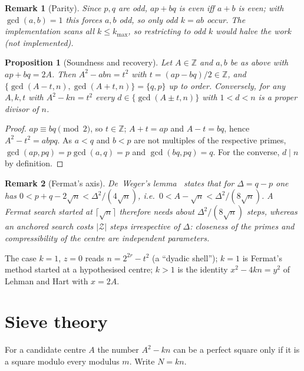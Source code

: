 \documentclass[11pt,a4paper]{article}
\newtheorem{proposition}{Proposition}[section]
\newtheorem{remark}{Remark}[section]
\newcommand{\Z}{\mathbb Z}
\begin{document}
\begin{remark}[Parity]\label{rem:parity}
Since $p,q$ are odd, $ap+bq$ is even iff $a+b$ is even; with $\gcd(a,b)=1$ this forces $a,b$ odd, so \emph{only odd $k=ab$ occur}. The implementation scans all $k\le k_{\max}$, so restricting to odd $k$ would halve the work (not implemented).
\end{remark}

\begin{proposition}[Soundness and recovery]\label{prop:rec}
Let $A\in\Z$ and $a,b$ be as above with $ap+bq=2A$. Then $A^2-abn=t^2$ with $t=(ap-bq)/2\in\Z$, and $\{\gcd(A-t,n),\gcd(A+t,n)\}=\{q,p\}$ up to order. Conversely, for any $A,k,t$ with $A^2-kn=t^2$ every $d\in\{\gcd(A\pm t,n)\}$ with $1<d<n$ is a proper divisor of $n$.
\end{proposition}
\begin{proof}
$ap\equiv bq \pmod 2$, so $t\in\Z$; $A+t=ap$ and $A-t=bq$, hence $A^2-t^2=abpq$. As $a<q$ and $b<p$ are not multiples of the respective primes, $\gcd(ap,pq)=p\gcd(a,q)=p$ and $\gcd(bq,pq)=q$. For the converse, $d\mid n$ by definition.
\end{proof}
\begin{remark}[Fermat's axis]\label{rem:fermat}
De~Weger's lemma~\cite{deweger} states that for $\Delta=q-p$ one has $0<p+q-2\sqrt n<\Delta^2/(4\sqrt n)$, i.e.\ $0<A-\sqrt n<\Delta^2/(8\sqrt n)$. A Fermat search started at $\lceil\sqrt n\rceil$ therefore needs about $\Delta^2/(8\sqrt n)$ steps, whereas an anchored search costs $|\mathcal Z|$ steps irrespective of $\Delta$: closeness of the primes and compressibility of the centre are independent parameters.
\end{remark}
The case $k=1$, $z=0$ reads $n=2^{2r}-t^2$ (a ``dyadic shell''); $k=1$ is Fermat's method started at a hypothesised centre; $k>1$ is the identity $x^2-4kn=y^2$ of Lehman and Hart with $x=2A$.

\section{Sieve theory}\label{sec:sieve}
For a candidate centre $A$ the number $A^2-kn$ can be a perfect square only if it is a square modulo every modulus $m$. Write $N=kn$.
\end{document}
